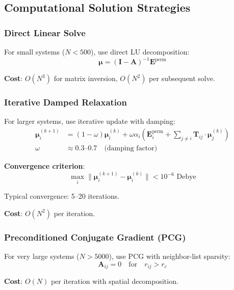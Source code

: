 \documentclass[11pt,letterpaper]{article}
\newcommand{\vE}{\mathbf{E}}
\newcommand{\vmu}{\boldsymbol{\mu}}
\begin{document}
\subsection{Computational Solution Strategies}

\subsubsection{Direct Linear Solve}

For small systems ($N < 500$), use direct LU decomposition:
\begin{equation}
\boldsymbol{\mu} = \left( \mathbf{I} - \mathbf{A} \right)^{-1} \mathbf{E}^{\text{perm}}
\end{equation}

\textbf{Cost}: $O(N^3)$ for matrix inversion, $O(N^2)$ per subsequent solve.

\subsubsection{Iterative Damped Relaxation}

For larger systems, use iterative update with damping:
\begin{align}
\vmu_i^{(k+1)} &= (1 - \omega) \vmu_i^{(k)} + \omega \alpha_i \left( \vE_i^{\text{perm}} + \sum_{j \neq i} \mathbf{T}_{ij} \cdot \vmu_j^{(k)} \right) \\
\omega &\approx 0.3 \text{--} 0.7 \quad \text{(damping factor)}
\end{align}

\textbf{Convergence criterion}:
\begin{equation}
\max_i \| \vmu_i^{(k+1)} - \vmu_i^{(k)} \| < 10^{-6} \text{ Debye}
\end{equation}

Typical convergence: 5--20 iterations.

\textbf{Cost}: $O(N^2)$ per iteration.

\subsubsection{Preconditioned Conjugate Gradient (PCG)}

For very large systems ($N > 5000$), use PCG with neighbor-list sparsity:
\begin{equation}
\mathbf{A}_{ij} = 0 \quad \text{for} \quad r_{ij} > r_c
\end{equation}

\textbf{Cost}: $O(N)$ per iteration with spatial decomposition.
\end{document}
